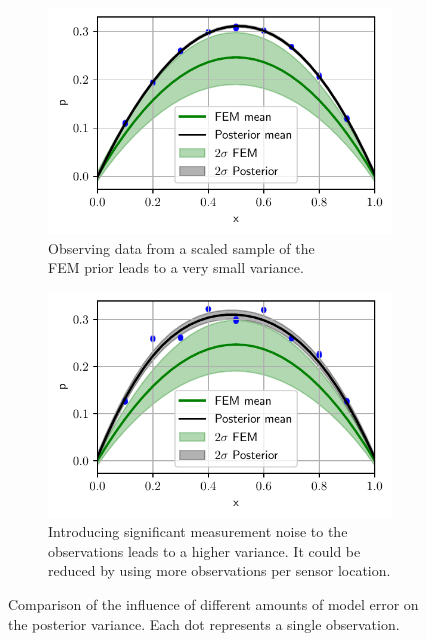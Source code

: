 \documentclass[%
  a4paper,oneside,%
  11pt,%
  smallchapters,
  style=printdev,
  extramargin,
  green,%
  rgb, <cmyk>
  ]{tubsbook}
\begin{document}
\begin{figure}[!ht]

	\begin{subfigure}[t]{.5\textwidth}
	\centering
	\includegraphics[width=1\linewidth]{../../Python/Results/1D/no_d_scaled_40proc.pdf}
	\caption{Observing data from a scaled sample of the\\
	 FEM prior leads to a very small variance.}
		\label{fig:NoModelError1D}
	\end{subfigure}%
	\begin{subfigure}[t]{.5\textwidth}
	\centering
	\includegraphics[width=1\linewidth]{../../Python/Results/1D/d_scaled40proc.pdf}
\centering
\caption{Introducing significant measurement noise to the observations leads to a higher variance. It could be reduced by using more observations per sensor location.}
\label{fig:ModelError1D2}
	\end{subfigure}

\caption{Comparison of the influence of different amounts of model error on the posterior variance. Each dot represents a single observation.}
\label{fig:ModErrNoModErr1D}
\end{figure}
%
\end{document}
